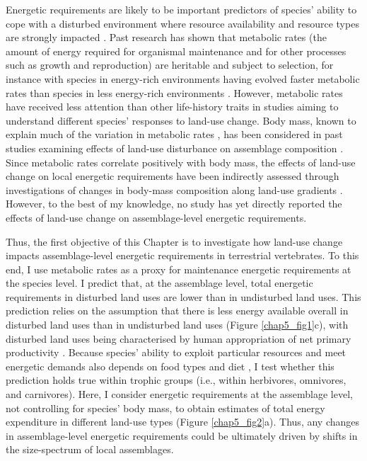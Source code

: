 Energetic requirements are likely to be important predictors of species’ ability to cope with a disturbed environment where resource availability and resource types are strongly impacted \citep{Auer2020}. Past research has shown that metabolic rates (the amount of energy required for organismal maintenance and for other processes such as growth and reproduction) are heritable and subject to selection, for instance with species in energy-rich environments having evolved faster metabolic rates than species in less energy-rich environments \citep{Mueller2001}. However, metabolic rates have received less attention than other life-history traits in studies aiming to understand different species’ responses to land-use change. Body mass, known to explain much of the variation in metabolic rates \citep{White2003, Hudson2013, Bushuev2018}, has been considered in past studies examining effects of land-use disturbance on assemblage composition \citep{Hevia2017}. Since metabolic rates correlate positively with body mass, the effects of land-use change on local energetic requirements have been indirectly assessed through investigations of changes in body-mass composition along land-use gradients \citep{Newbold2020a, Tinoco2018}. However, to the best of my knowledge, no study has yet directly reported the effects of land-use change on assemblage-level energetic requirements. 

Thus, the first objective of this Chapter is to investigate how land-use change impacts assemblage-level energetic requirements in terrestrial vertebrates. To this end, I use metabolic rates as a proxy for maintenance energetic requirements at the species level. I predict that, at the assemblage level, total energetic requirements in disturbed land uses are lower than in undisturbed land uses. This prediction relies on the assumption that there is less energy available overall in disturbed land uses than in undisturbed land uses (Figure \ref{chap5_fig1}c), with disturbed land uses being characterised by human appropriation of net primary productivity \citep{Krausmann2013}. Because species’ ability to exploit particular resources and meet energetic demands also depends on food types and diet \citep{Mendoza2019, McNab1986}, I test whether this prediction holds true within trophic groups (i.e., within herbivores, omnivores, and carnivores). Here, I consider energetic requirements at the assemblage level, not controlling for species' body mass, to obtain estimates of total energy expenditure in different land-use types (Figure \ref{chap5_fig2}a). Thus, any changes in assemblage-level energetic requirements could be ultimately driven by shifts in the size-spectrum of local assemblages. 

